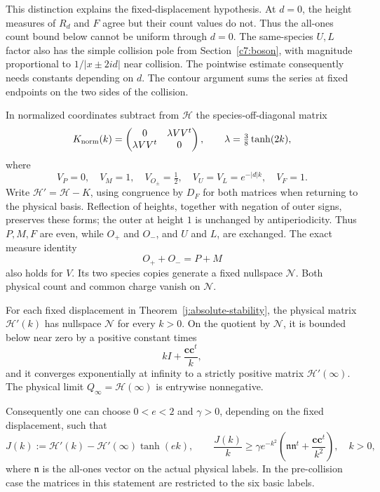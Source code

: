 This distinction explains the fixed-displacement hypothesis. At \(d=0\), the height measures of \(R_d\) and \(F\) agree but their count values do not. Thus the all-ones count bound below cannot be uniform through \(d=0\). The same-species \(U,L\) factor also has the simple collision pole from Section~\ref{c7:boson}, with magnitude proportional to \(1/|x\pm2id|\) near collision. The pointwise estimate consequently needs constants depending on \(d\). The contour argument sums the series at fixed endpoints on the two sides of the collision.

In normalized coordinates subtract from \(\mathcal H\) the species-off-diagonal matrix
\[
K_{\rm norm}(k)=
\begin{pmatrix}0&\lambda VV^t\\ \lambda VV^t&0\end{pmatrix},
\qquad
\lambda=\tfrac38\tanh(2k),
\]
where
\[
V_P=0,\quad V_M=1,\quad V_{O_\pm}=\tfrac12,\quad
V_U=V_L=e^{-|d|k},\quad V_F=1.
\]
Write \(\mathcal H'=\mathcal H-K\), using congruence by \(D_F\) for both matrices when returning to the physical basis. Reflection of heights, together with negation of outer signs, preserves these forms; the outer at height \(1\) is unchanged by antiperiodicity. Thus \(P,M,F\) are even, while \(O_+\) and \(O_-\), and \(U\) and \(L\), are exchanged. The exact measure identity
\[
O_++O_-=P+M
\]
also holds for \(V\). Its two species copies generate a fixed nullspace \(\mathcal N\). Both physical count and common charge vanish on \(\mathcal N\).

\begin{lemma}\label{j:stability-coercivity}
For each fixed displacement in Theorem~\ref{j:absolute-stability}, the physical matrix \(\mathcal H'(k)\) has nullspace \(\mathcal N\) for every \(k>0\). On the quotient by \(\mathcal N\), it is bounded below near zero by a positive constant times
\[
kI+\frac{\boldsymbol c\boldsymbol c^t}{k},
\]
and it converges exponentially at infinity to a strictly positive matrix \(\mathcal H'(\infty)\). The physical limit \(Q_\infty=\mathcal H(\infty)\) is entrywise nonnegative.

Consequently one can choose \(0<e<2\) and \(\gamma>0\), depending on the fixed displacement, such that
\begin{equation}\label{j:stability-J}
J(k):=\mathcal H'(k)-\mathcal H'(\infty)\tanh(ek),
\qquad
\frac{J(k)}{k}\ge
\gamma e^{-k^2}\left(
\mathfrak n\mathfrak n^t+
\frac{\boldsymbol c\boldsymbol c^t}{k^2}\right),\quad k>0,
\end{equation}
where \(\mathfrak n\) is the all-ones vector on the actual physical labels. In the pre-collision case the matrices in this statement are restricted to the six basic labels.
\end{lemma}

